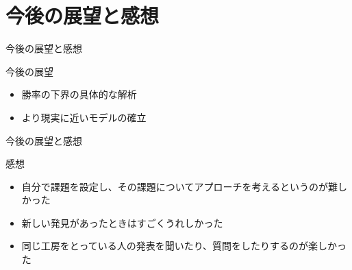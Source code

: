 \section{今後の展望と感想}
\begin{frame}{今後の展望と感想}
    \begin{block}{今後の展望}
        \begin{itemize}
            \item 勝率の下界の具体的な解析
            \item より現実に近いモデルの確立
        \end{itemize}
    \end{block}
\end{frame}

\begin{frame}{今後の展望と感想}
    \begin{block}{感想}
        \begin{itemize}
            \item 自分で課題を設定し、その課題についてアプローチを考えるというのが難しかった
            \item 新しい発見があったときはすごくうれしかった
            \item 同じ工房をとっている人の発表を聞いたり、質問をしたりするのが楽しかった
        \end{itemize}
    \end{block}
\end{frame}
